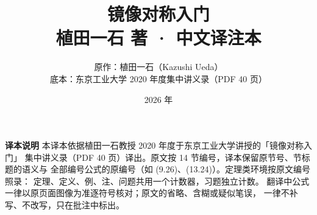 

\title{\bfseries 镜像对称入门\\[6pt]
  \large\mdseries 植田一石 著 · 中文译注本}
\author{原作：植田一石（Kazushi Ueda）\\[2pt]
  \small 底本：东京工业大学 2020 年度集中讲义录（PDF 40 页）}
\date{2026 年}


\maketitle
\thispagestyle{empty}

\vspace{2em}
\begin{center}
\begin{minipage}{0.86\textwidth}
\small
\textbf{译本说明}\quad
本译本依据植田一石教授 2020 年度于东京工业大学讲授的「镜像对称入门」
集中讲义录（PDF 40 页）译出。原文按 14 节编号，译本保留原节号、节标题的语义与
全部编号公式的原编号（如 (9.26)、(13.24)）。定理类环境按原文编号照录：
定理、定义、例、注、问题共用一个计数器，习题独立计数。
翻译中公式一律以原页面图像为准逐符号核对；原文的省略、含糊或疑似笔误，
一律不补写、不改写，只在批注中标出。
\end{minipage}
\end{center}

\vspace{1em}
\tableofcontents
\newpage



